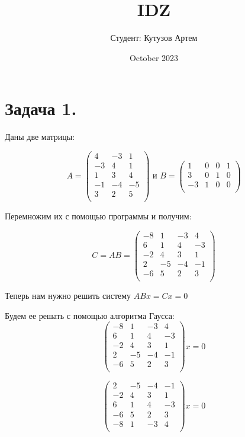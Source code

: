 \documentclass{article}
\title{IDZ}
\author{Студент: Кутузов Артем}
\date{October 2023}
\begin{document}
\maketitle

\section{Задача 1.}

Даны две матрицы:

\[
A =
\left(
\begin{matrix}
4& -3& 1\\
-3& 4& 1\\
1& 3& 4\\
-1& -4& -5\\
3& 2& 5\\
\end{matrix}
\right)
\text { и }
B =
\left(
\begin{matrix}
1& 0& 0& 1\\
3& 0& 1& 0\\
-3& 1& 0& 0\\
\end{matrix}
\right)
\]

Перемножим их с помощью программы и получим:

\[
C = AB =
\left(
\begin{matrix}
-8& 1& -3& 4\\
6& 1& 4& -3\\
-2& 4& 3& 1\\
2& -5& -4& -1\\
-6& 5& 2& 3\\
\end{matrix}
\right)
\]

Теперь нам нужно решить систему $ABx = Cx = 0$

Будем ее решать с помощью алгоритма Гаусса:
\[
\left(
\begin{matrix}
-8& 1& -3& 4\\
6& 1& 4& -3\\
-2& 4& 3& 1\\
2& -5& -4& -1\\
-6& 5& 2& 3\\
\end{matrix}
\right) x = 0
\]

\[
\left(
\begin{matrix}
2& -5& -4& -1\\
-2& 4& 3& 1\\
6& 1& 4& -3\\
-6& 5& 2& 3\\
-8& 1& -3& 4\\
\end{matrix}
\right) x = 0
\]
\end{document}
